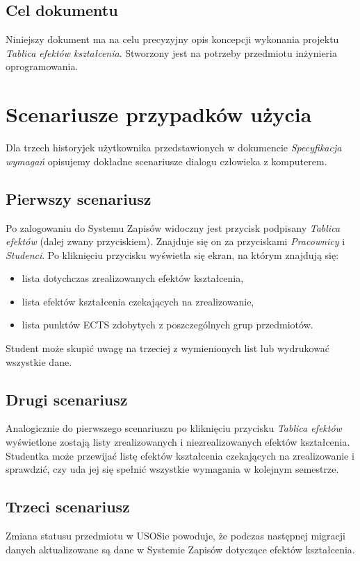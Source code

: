 \documentclass{article}
\begin{document}
\subsection{Cel dokumentu}
Niniejszy dokument ma na celu precyzyjny opis koncepcji wykonania projektu \textit{Tablica efektów kształcenia}.
Stworzony jest na potrzeby przedmiotu inżynieria oprogramowania.


\section{Scenariusze przypadków użycia}
Dla trzech historyjek użytkownika przedstawionych w dokumencie \textit{Specyfikacja wymagań} opisujemy dokładne scenariusze dialogu człowieka z komputerem.

\subsection{Pierwszy scenariusz}
Po zalogowaniu do Systemu Zapisów widoczny jest przycisk podpisany \textit{Tablica efektów} (dalej zwany przyciskiem). 
Znajduje się on za przyciskami \textit{Pracownicy} i \textit{Studenci}. Po kliknięciu przycisku wyświetla się ekran, na którym znajdują się:
\begin{itemize}
	\item lista dotychczas zrealizowanych efektów kształcenia,
	\item lista efektów kształcenia czekających na zrealizowanie,
	\item lista punktów ECTS zdobytych z poszczególnych grup przedmiotów.
\end{itemize}
Student może skupić uwagę na trzeciej z wymienionych list lub wydrukować wszystkie dane.

\subsection{Drugi scenariusz}
Analogicznie do pierwszego scenariuszu po kliknięciu przycisku \textit{Tablica efektów} wyświetlone zostają listy zrealizowanych i niezrealizowanych efektów kształcenia.
Studentka może przewijać listę efektów kształcenia czekających na zrealizowanie i sprawdzić, czy uda jej się spełnić wszystkie wymagania w kolejnym semestrze.

\subsection{Trzeci scenariusz}
Zmiana statusu przedmiotu w USOSie powoduje, że podczas następnej migracji danych aktualizowane są dane w Systemie Zapisów dotyczące efektów kształcenia.
\end{document}
